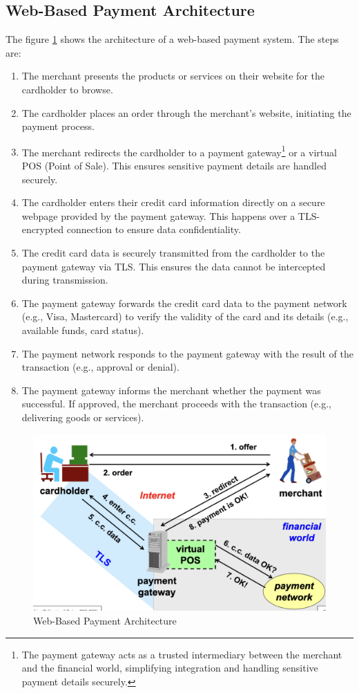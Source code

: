 \subsection{Web-Based Payment Architecture}
The figure \ref{fig:wb_pay} shows the architecture of a web-based payment system. The steps are:
\begin{enumerate}
    \item The merchant presents the products or services on their website for the cardholder to browse.
    \item The cardholder places an order through the merchant’s website, initiating the payment process.
    \item The merchant redirects the cardholder to a payment gateway\footnote{The payment gateway acts as a trusted intermediary between the merchant and the financial world, simplifying integration and handling sensitive payment details securely.} or a virtual POS (Point of Sale). This ensures sensitive payment details are handled securely.
    \item The cardholder enters their credit card information directly on a secure webpage provided by the payment gateway. This happens over a TLS-encrypted connection to ensure data confidentiality.
    \item The credit card data is securely transmitted from the cardholder to the payment gateway via TLS. This ensures the data cannot be intercepted during transmission.
    \item The payment gateway forwards the credit card data to the payment network (e.g., Visa, Mastercard) to verify the validity of the card and its details (e.g., available funds, card status).
    \item The payment network responds to the payment gateway with the result of the transaction (e.g., approval or denial).
    \item The payment gateway informs the merchant whether the payment was successful. If approved, the merchant proceeds with the transaction (e.g., delivering goods or services).
\end{enumerate}

\begin{figure}[H]
    \centering
    \includegraphics[width=\linewidth]{Images/Appsec/wb_pay.png}
    \caption{Web-Based Payment Architecture}
    \label{fig:wb_pay}
\end{figure}

